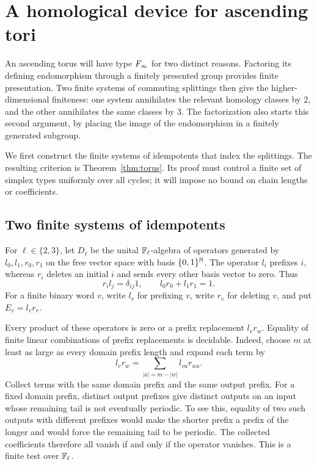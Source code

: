 \section{A homological device for ascending tori}
\label{sec:homological}

An ascending torus will have type $F_\infty$ for two distinct reasons.
Factoring its defining endomorphism through a finitely presented group
provides finite presentation.  Two finite systems of commuting
splittings then give the higher-dimensional finiteness: one system
annihilates the relevant homology classes by $2$, and the other
annihilates the same classes by $3$.  The factorization also starts
this second argument, by placing the image of the endomorphism in
a finitely generated subgroup.

We first construct the finite systems of idempotents that index the
splittings.  The resulting criterion is Theorem~\ref{thm:torus}.
Its proof must control a finite set of simplex types uniformly over
all cycles; it will impose no bound on chain lengths or coefficients.

\subsection{Two finite systems of idempotents}

For $\ell\in\{2,3\}$, let $D_\ell$ be the unital $\mathbb F_\ell$-algebra
of operators generated by $l_0,l_1,r_0,r_1$ on the free vector space
with basis $\{0,1\}^{\mathbb N}$.  The operator $l_i$ prefixes $i$, whereas
$r_i$ deletes an initial $i$ and sends every other basis vector to zero.
Thus
\begin{equation}\label{eq:binary-prefix-relations}
 r_i l_j=\delta_{ij}1,
 \qquad l_0r_0+l_1r_1=1.
\end{equation}
For a finite binary word $v$, write $l_v$ for prefixing $v$, write $r_v$
for deleting $v$, and put $E_v=l_vr_v$.

Every product of these operators is zero or a prefix replacement
$l_vr_w$.  Equality of finite linear combinations of prefix replacements
is decidable.  Indeed, choose $m$ at least as large as every domain
prefix length and expand each term by
\[
 l_vr_w=\sum_{|a|=m-|w|}l_{va}r_{wa}.
\]
Collect terms with the same domain prefix and the same output prefix.
For a fixed domain prefix, distinct output prefixes give distinct
outputs on an input whose remaining tail is not eventually periodic.
To see this, equality of two such outputs with different prefixes
would make the shorter prefix a prefix of the longer and would force
the remaining tail to be periodic.  The collected coefficients therefore
all vanish if and only if the operator vanishes.  This is a finite test
over $\mathbb F_\ell$.

